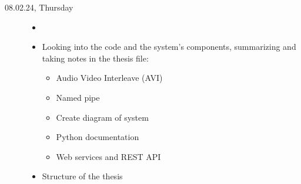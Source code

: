 \documentclass[a4, 11pt]{scrartcl}
\begin{document}
\begin{description}










\item[08.02.24, Thursday]
\begin{itemize}
	\item[]
	\item Looking into the code and the system's components, summarizing and taking notes in the thesis file:
	\begin{itemize}
		\item Audio Video Interleave (AVI)
		\item Named pipe
		\item Create diagram of system
		\item Python documentation
		\item Web services and REST API
	\end{itemize}
	\item Structure of the thesis
\end{itemize}











		
		
\end{description}
	
	
	
	
	
	
\end{document}
